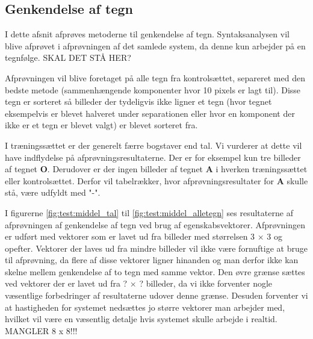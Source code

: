 
\subsection{Genkendelse af tegn}
I dette afsnit afprøves metoderne til genkendelse af tegn. Syntaksanalysen vil blive afprøvet i afprøvningen af det samlede system, da denne kun arbejder på en tegnfølge. SKAL DET STÅ HER?

Afprøvningen vil blive foretaget på alle tegn fra kontrolsættet, separeret med den bedste metode (sammenhængende komponenter hvor 10 pixels er lagt til). Disse tegn er sorteret så billeder der tydeligvis ikke ligner et tegn (hvor tegnet eksempelvis er blevet halveret under separationen eller hvor en komponent der ikke er et tegn er blevet valgt) er blevet sorteret fra.

I træningssættet er der generelt færre bogstaver end tal. Vi vurderer at dette vil have indflydelse på afprøvningsresultaterne. Der er for eksempel kun tre billeder af tegnet \textbf{O}. Derudover er der ingen billeder af tegnet \textbf{A} i hverken træningssættet eller kontrolsættet. Derfor vil tabelrækker, hvor afprøvningsresultater for \textbf{A} skulle stå, være udfyldt med "-".


I figurerne \ref{fig:test:middel_tal} til \ref{fig:test:middel_alletegn} ses resultaterne af afprøvningen af genkendelse af tegn ved brug af egenskabsvektorer. Afprøvningen er udført med vektorer som er lavet ud fra billeder med størrelsen 3 $\times$ 3 og opefter. Vektorer der laves ud fra mindre billeder vil ikke være fornuftige at bruge til afprøvning, da flere af disse vektorer ligner hinanden og man derfor ikke kan skelne mellem genkendelse af to tegn med samme vektor. Den øvre grænse sættes ved vektorer der er lavet ud fra ? $\times$ ? billeder, da vi ikke forventer nogle væsentlige forbedringer af resultaterne udover denne grænse. Desuden forventer vi at hastigheden for systemet nedsættes jo større vektorer man arbejder med, hvilket vil være en væsentlig detalje hvis systemet skulle arbejde i realtid. MANGLER 8 x 8!!!

